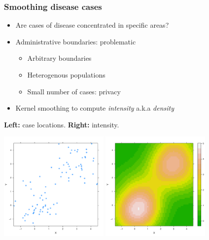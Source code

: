 \documentclass{beamer}
\begin{document}
\begin{frame}\frametitle{Smoothing disease cases}
    \begin{itemize}
        \item Are cases of disease concentrated in specific areas?
        \item Administrative boundaries: problematic
            \begin{itemize}
                \item Arbitrary boundaries
                \item Heterogenous populations
                \item Small number of cases: privacy
            \end{itemize}
        \item \alert{Kernel smoothing} to compute \emph{intensity} a.k.a \emph{density}
    \end{itemize}
    \begin{example}{\textbf{Left:} case locations. \textbf{Right:} intensity.}
    \centerline{
        \label{fig:points-and-dkd}
        \centering
        \includegraphics[width=0.4\textwidth]{example-incidents}
        \includegraphics[width=0.4\textwidth]{example-incidents-smoothed}
    }
    \end{example}
\end{frame}
\end{document}
